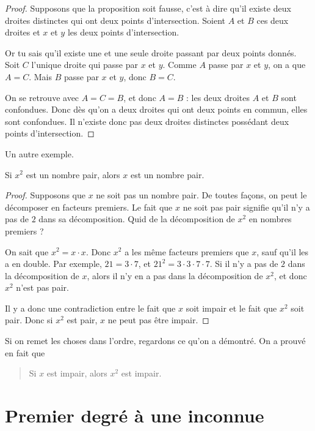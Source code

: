 \begin{proof}
Supposons que la proposition soit fausse, c'est à dire qu'il existe deux droites distinctes qui ont deux points d'intersection. Soient $A$ et $B$ ces deux droites et $x$ et $y$ les deux points d'intersection.

Or tu sais qu'il existe une et une seule droite passant par deux points donnés. Soit $C$ l'unique droite qui passe par $x$ et $y$. Comme $A$ passe par $x$ et $y$, on a que $A=C$. Mais $B$ passe par $x$ et $y$, donc $B=C$.

On se retrouve avec $A=C=B$, et donc $A=B$ : les deux droites $A$ et $B$ sont confondues. Donc dès qu'on a deux droites qui ont deux points en commun, elles sont confondues. Il n'existe donc pas deux droites distinctes possédant deux points d'intersection.

\end{proof}

Un autre exemple.

\begin{proposition}
Si $x^2$ est un nombre pair, alors $x$ est un nombre pair.
\end{proposition}

\begin{proof}
Supposons que $x$ ne soit pas un nombre pair. De toutes façons, on peut le décomposer en facteurs premiers. Le fait que $x$ ne soit pas pair signifie qu'il n'y a pas de $2$ dans sa décomposition. Quid de la décomposition de $x^2$ en nombres premiers ?

On sait que $x^2=x\cdot x$. Donc $x^2$ a les même facteurs premiers que $x$, sauf qu'il les a en double. Par exemple, $21=3\cdot 7$, et $21^2=3\cdot 3\cdot 7\cdot 7$. Si il n'y a pas de $2$ dans la décomposition de $x$, alors il n'y en a pas dans la décomposition de $x^2$, et donc $x^2$ n'est pas pair.

Il y a donc une contradiction entre le fait que $x$ soit impair et le fait que $x^2$ soit pair. Donc si $x^2$ est pair, $x$ ne peut pas être impair.
\end{proof}

Si on remet les choses dans l'ordre, regardons ce qu'on a démontré. On a prouvé en fait que 
\begin{quote}
Si $x$ est impair, alors $x^2$ est impair.
\end{quote}

\section{Premier degré à une inconnue}


